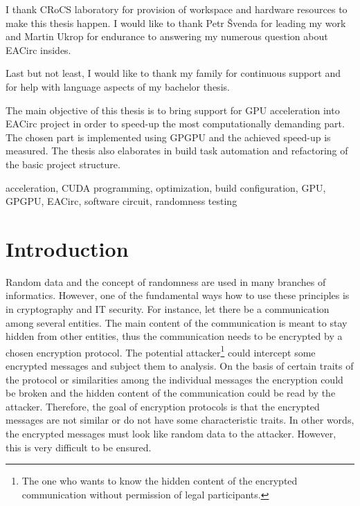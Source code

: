 \documentclass[12pt,oneside]{fithesis2}
\begin{document}
\FrontMatter
	\ThesisTitlePage
	\begin{ThesisDeclaration}
		\DeclarationText
		\AdvisorName
	\end{ThesisDeclaration}
	\begin{ThesisThanks}
		I thank CRoCS laboratory for provision of workspace and hardware resources to make this thesis happen. I would like to thank Petr Švenda for leading my work and Martin Ukrop for endurance to answering my numerous question about EACirc insides.
		
		\bigskip
		
		\noindent
		Last but not least, I would like to thank my family for continuous support and for help with language aspects of my bachelor thesis.
	\end{ThesisThanks}
	\begin{ThesisAbstract}
		The main objective of this thesis is to bring support for GPU acceleration into EACirc project in order to speed-up the most computationally demanding part. The chosen part is implemented using GPGPU and the achieved speed-up is measured. The thesis also elaborates in build task automation and refactoring of the basic project structure.
	\end{ThesisAbstract}
	\begin{ThesisKeyWords}
		acceleration, CUDA programming, optimization, build configuration, GPU, GPGPU, EACirc, software circuit, randomness testing
	\end{ThesisKeyWords}
	\tableofcontents

\MainMatter
\chapter{Introduction}
Random data and the concept of randomness are used in many branches of informatics. However, one of the fundamental ways how to use these principles is in cryptography and IT security. For instance, let there be a communication among several entities. The main content of the communication is meant to stay hidden from other entities, thus the communication needs to be encrypted by a chosen encryption protocol. The potential attacker\footnote{The one who wants to know the hidden content of the encrypted communication without permission of legal participants.} could intercept some encrypted messages and subject them to analysis. On the basis of certain traits of the protocol or similarities among the individual messages the encryption could be broken and the hidden content of the communication could be read by the attacker. Therefore, the goal of encryption protocols is that the encrypted messages are not similar or do not have some characteristic traits. In other words, the encrypted messages must look like random data to the attacker. However, this is very difficult to be ensured.
\end{document}
